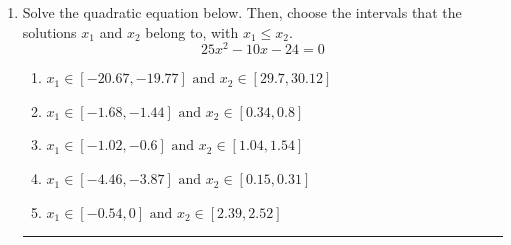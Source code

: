 \documentclass[14pt]{extbook}
\newcommand{\litem}[1]{\item#1\hspace*{-1cm}\rule{\textwidth}{0.4pt}}
\begin{document}
\begin{enumerate}
{\begin{enumerate}[label=\Alph*.]
\end{enumerate} }
\litem{
Solve the quadratic equation below. Then, choose the intervals that the solutions $x_1$ and $x_2$ belong to, with $x_1 \leq x_2$.\[ 25x^{2} -10 x -24 = 0 \]\begin{enumerate}[label=\Alph*.]
\item \( x_1 \in [-20.67, -19.77] \text{ and } x_2 \in [29.7, 30.12] \)
\item \( x_1 \in [-1.68, -1.44] \text{ and } x_2 \in [0.34, 0.8] \)
\item \( x_1 \in [-1.02, -0.6] \text{ and } x_2 \in [1.04, 1.54] \)
\item \( x_1 \in [-4.46, -3.87] \text{ and } x_2 \in [0.15, 0.31] \)
\item \( x_1 \in [-0.54, 0] \text{ and } x_2 \in [2.39, 2.52] \)


\end{enumerate}}
\end{enumerate}
\end{document}
